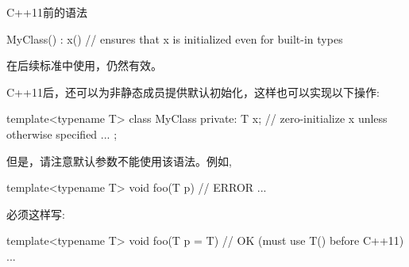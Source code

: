 C++11前的语法

\begin{cpp}
MyClass() : x() { // ensures that x is initialized even for built-in types
}
\end{cpp}

在后续标准中使用，仍然有效。

C++11后，还可以为非静态成员提供默认初始化，这样也可以实现以下操作:

\begin{cpp}
template<typename T>
class MyClass {
private:
	T x{}; // zero-initialize x unless otherwise specified
	...
};
\end{cpp}

但是，请注意默认参数不能使用该语法。例如,

\begin{cpp}
template<typename T>
void foo(T p{}) { // ERROR
	...
}
\end{cpp}

必须这样写:

\begin{cpp}
template<typename T>
void foo(T p = T{}) { // OK (must use T() before C++11)
	...
}
\end{cpp}






















